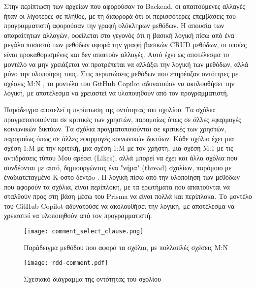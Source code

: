 Στην περίπτωση των αρχείων που αφορούσαν το \textlatin{Backend}, οι
απαιτούμενες αλλαγές ήταν οι λίγοτερες σε πλήθος, με τη διαφρορά ότι οι
περισσότερες επεμβάσεις του προγραμματιστή αφορούσαν την γραφή ολόκληρων
μεθόδων. Η απουσία των απαραίτητων αλλαγών, οφείλεται στο γεγονός ότι η
βασική λογική πίσω από ένα μεγάλο ποσοστό των μεθόδων αφορά την γραφή
βασικών \textlatin{CRUD} μεθόδων, οι οποίες είναι προκαθορισμένες και
δεν απαιτούν αλλαγές. Αυτό έχει ως αποτέλεσμα το μοντέλο να μην
χρειάζεται να προτρέπεται να αλλάξει την λογική των μεθόδων, αλλά μόνο
την υλοποίηση τους. Στις περιπτώσεις μεθόδων που επηρέαζαν οντότητες με
σχέσεις Μ:Ν \cite{prisma2022manytomany}, το μοντέλο του
\textlatin{GitHub Copilot} αδυνατούσε να ακολουθήσει την λογική, με
αποτέλεσμα να χρειαστεί να υλοποιηθούν από τον προγραμματιστή.

Παράδειγμα αποτελεί η περίπτωση της οντότητας του σχολίου. Τα σχόλια
πραγματοποιούνται σε κριτικές των χρηστών, παρομοίως όπως σε άλλες
εφαρμογές κοινωνικών δικτύων. Τα σχόλια πραγματοποιούνται σε κριτικές
των χρηστών, παρομοίως όπως σε άλλες εφαρμογές κοινωνικών δικτύων. Κάθε
σχόλιο έχει μια σχέση 1:Μ με την κριτική, μια σχέση 1:Μ με τον χρήστη,
μια σχέση Μ:1 με τις αντιδράσεις τύπου Μου αρέσει \textlatin{(Likes)},
αλλά μπορεί να έχει και άλλα σχόλια που συνδέονται με αυτό,
δημιουργώντας ένα "νήμα" \textlatin{(thread)} σχολίων, παρόμοιο
με έναδιατεταγμένο Κ-οστο δέντρo \cite{gabillon2002access}. Η λογική
πίσω από την υλοποίηση των μεθόδων που αφορούν τα σχόλια, είναι
περίπλοκη, με τα ερωτήματα που απαιτούνται να σταλθούν προς στη βάση
μέσω του \textlatin{Prisma} να είναι πολλά και περίπλοκα. Το μοντέλο του
\textlatin{GitHub Copilot} αδυνατούσε να ακολουθήσει την λογική, με
αποτέλεσμα να χρειαστεί να υλοποιηθούν από τον προγραμματιστή.

\begin{figure}[H]
  \begin{center}
    \texttt{[image: comment\_select\_clause.png]}
    \caption{Παράδειγμα μεθόδου που αφορά τα σχόλια, με πολλαπλές
      σχέσεις Μ:Ν}
  \end{center}
  \label{fig:commentSelectClause}
\end{figure}

\begin{figure}[H]
  \begin{center}
    \texttt{[image: rdd-comment.pdf]}
    \caption{Σχεσιακό διάγραμμα της οντότητας του σχολίου}
  \end{center}
  \label{fig:commentRdd}
\end{figure}

